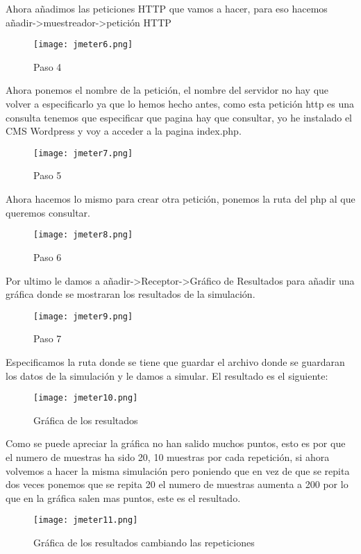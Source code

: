 Ahora añadimos las peticiones HTTP que vamos a hacer, para eso hacemos añadir->muestreador->petición HTTP
\begin{figure}[H] 
\centering
\texttt{[image: jmeter6.png]}  
\label{figura36:}
\caption{Paso 4}
\end{figure}
Ahora ponemos el nombre de la petición, el nombre del servidor no hay que volver a especificarlo ya que lo hemos hecho antes, como esta petición http es una consulta tenemos que especificar que pagina hay que consultar, yo he instalado el CMS Wordpress y voy a acceder a la pagina index.php.
\begin{figure}[H] 
\centering
\texttt{[image: jmeter7.png]}  
\label{figura35:}
\caption{Paso 5}
\end{figure}
Ahora hacemos lo mismo para crear otra petición, ponemos la ruta del php al que queremos consultar.
\begin{figure}[H] 
\centering
\texttt{[image: jmeter8.png]}  
\label{figura35:}
\caption{Paso 6}
\end{figure}
Por ultimo le damos a añadir->Receptor->Gráfico de Resultados para añadir una gráfica donde se mostraran los resultados de la simulación.
\begin{figure}[H] 
\centering
\texttt{[image: jmeter9.png]}  
\label{figura36:}
\caption{Paso 7}
\end{figure}
Especificamos la ruta donde se tiene que guardar el archivo donde se guardaran los datos de la simulación y le damos a simular.
El resultado es el siguiente:
\begin{figure}[H] 
\centering
\texttt{[image: jmeter10.png]}  
\label{figura37:}
\caption{Gráfica de los resultados}
\end{figure}
Como se puede apreciar la gráfica no han salido muchos puntos, esto es por que el numero de muestras ha sido 20, 10 muestras por cada repetición, si ahora volvemos a hacer la misma simulación pero poniendo que en vez de que se repita dos veces ponemos que se repita 20 el numero de muestras aumenta a 200 por lo que en la gráfica salen mas puntos, este es el resultado.
\begin{figure}[H] 
\centering
\texttt{[image: jmeter11.png]}  
\label{figura38:}
\caption{Gráfica de los resultados cambiando las repeticiones}
\end{figure}
